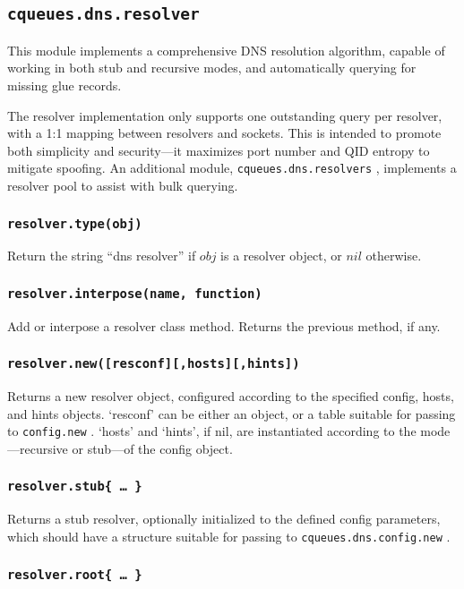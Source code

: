 \documentclass[11pt, oneside]{memoir}
\newcommand{\routine}[1]{\texttt{#1} }
\newcommand{\fn}[1]{\texttt{#1} }
\newcommand{\module}[1]{\texttt{#1} }
\newcounter{toccols}
\newenvironment{Module}[1]{
	\subsection{\texttt{#1}}
	\addtocontents{toc}{
		\protect\begin{multicols}{\value{toccols}}
	}
}{
	\addtocontents{toc}{\protect\end{multicols}}
}
\begin{document}
\begin{Module}{cqueues.dns.resolver}

This module implements a comprehensive DNS resolution algorithm, capable of working in both stub and recursive modes, and automatically querying for missing glue records.

The resolver implementation only supports one outstanding query per resolver, with a 1:1 mapping between resolvers and sockets. This is intended to promote both simplicity and security---it maximizes port number and QID entropy to mitigate spoofing. An additional module, \module{cqueues.dns.resolvers}, implements a resolver pool to assist with bulk querying.

\subsubsection[\routine{resolver.type}]{\routine{resolver.type(obj)}}
Return the string ``dns resolver'' if $obj$ is a resolver object, or $nil$ otherwise.

\subsubsection[\fn{resolver.interpose}]{\fn{resolver.interpose(name, function)}}

Add or interpose a resolver class method. Returns the previous method, if any.

\subsubsection[\fn{resolver.new}]{\fn{resolver.new([resconf][,hosts][,hints])}}

Returns a new resolver object, configured according to the specified config, hosts, and hints objects. `resconf' can be either an object, or a table suitable for passing to \fn{config.new}. `hosts' and `hints', if nil, are instantiated according to the mode---recursive or stub---of the config object.

\subsubsection[\fn{resolver.stub}]{\fn{resolver.stub\{ … \}}}

Returns a stub resolver, optionally initialized to the defined config parameters, which should have a structure suitable for passing to \fn{cqueues.dns.config.new}.

\subsubsection[\fn{resolver.root}]{\fn{resolver.root\{ … \}}}


\end{Module}
\end{document}
